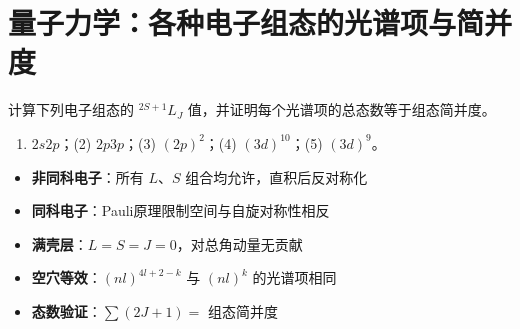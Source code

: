 \section{量子力学：各种电子组态的光谱项与简并度}
\label{sec:atomic-configurations-terms}

\begin{modelbox}[题目：各种电子组态的光谱项与简并度]
计算下列电子组态的 $^{2S+1}L_J$ 值，并证明每个光谱项的总态数等于组态简并度。
\begin{enumerate}
    \item[(1)] $2s2p$；\quad (2) $2p3p$；\quad (3) $(2p)^2$；\quad (4) $(3d)^{10}$；\quad (5) $(3d)^9$。
\end{enumerate}
\end{modelbox}

\begin{tipbox}[考点快速分析]
\begin{itemize}
    \item \textbf{非同科电子}：所有 $L$、$S$ 组合均允许，直积后反对称化
    \item \textbf{同科电子}：Pauli原理限制空间与自旋对称性相反
    \item \textbf{满壳层}：$L=S=J=0$，对总角动量无贡献
    \item \textbf{空穴等效}：$(nl)^{4l+2-k}$ 与 $(nl)^k$ 的光谱项相同
    \item \textbf{态数验证}：$\sum(2J+1)=$ 组态简并度
\end{itemize}
\end{tipbox}

